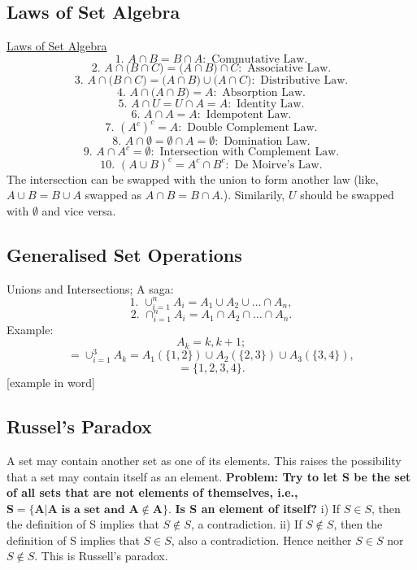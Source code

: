 \documentclass{article}
\begin{document}
\subsection{Laws of Set Algebra}
\underline{ Laws of Set Algebra}
\newline
$$1\text{. } A \cap B = B \cap A: \text{ Commutative Law}.$$
$$2\text{. } A \cap \text{(} B \cap C \text{)} = \text{(} A \cap B \text{)} \cap C: \text{ Associative Law}.$$
$$3\text{. } A \cap \text{(} B \cap C \text{)} = \text{(} A \cap B \text{)} \cup \text{(} A \cap C \text{)}: \text{ Distributive Law}.$$
$$4\text{. } A \cap \text{(} A \cap B \text{)} = A: \text{ Absorption Law}.$$
$$5\text{. } A \cap U = U \cap A = A: \text{ Identity Law}.$$
$$6\text{. } A \cap A = A: \text{ Idempotent Law}.$$
$$7\text{. } (A^c)^c = A: \text{ Double Complement Law}.$$
$$8\text{. } A \cap \emptyset = \emptyset \cap A = \emptyset: \text{ Domination Law}.$$
$$9\text{. } A \cap A^c = \emptyset: \text{ Intersection with Complement Law}.$$
$$10\text{. } (A \cup B)^c = A^c \cap B^c: \text{ De Moirve's Law}.$$
The intersection can be swapped with the union to form another law (like, $A \cup B = B \cup A$ swapped as $A \cap B = B \cap A.$). Similarily, $U$ should be swapped with $\emptyset$ and vice versa.
\newpage
\subsection{Generalised Set Operations}
Unions and Intersections; A saga:
$$1 \text{. } \cup_{i=1}^{n}A_i = A_1 \cup A_2 \cup \dots \cap A_n,$$
$$2 \text{. } \cap_{i=1}^{n} A_i = A_1 \cap A_2 \cap \dots \cap A_n.$$
Example:
\newline
\newline
$$A_k = {k, k + 1};$$
$$= \cup_{i=1}^{3}A_k = A_1 (\{1, 2\}) \cup A_2 (\{2, 3\}) \cup A_3 (\{3, 4\}),$$
$$= \{1, 2, 3, 4\}.$$
[example in word]
\newpage
\subsection{Russel's Paradox}
A set may contain another set as one of its elements.
\newline
This raises the possibility that a set may contain itself as an element.
\newline
\newline
\textbf{Problem: Try to let S be the set of all sets that are not elements of themselves, i.e.,}
$\mathbf{S = \{ A | A }\textbf{ is a set and } \mathbf{A \not\in A \}}.$
\newline
\textbf{Is S an element of itself?}
\newline
i)	If $S \in S$, then the definition of S implies that $S \not \in S$, a contradiction.
\newline
ii)	If $S \not \in S$, then the definition of S implies that $S \in S$, also a contradiction.
Hence neither $S \in S$ nor $S \not \in S$. This is Russell’s paradox.
\newpage
\end{document}
